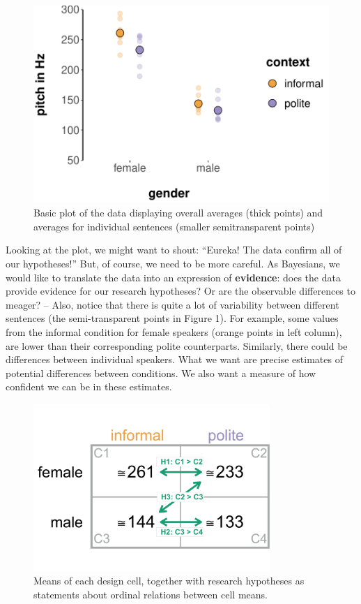 \documentclass[nobib]{tufte-handout}
\begin{document}
\begin{figure}[t]
  \centering
    \includegraphics[width = \textwidth]{pics/basic_data_plot.pdf}
    \caption{Basic plot of the data displaying overall averages (thick points) and averages for individual sentences (smaller semitransparent points)}
     \label{fig:BasicPlotData_data}
\end{figure}


Looking at the plot, we might want to shout: ``Eureka! The data confirm all of our
hypotheses!'' But, of course, we need to be more careful. As Bayesians, we would like to
translate the data into an expression of \textbf{evidence}: does the data provide evidence for
our research hypotheses? Or are the observable differences to meager? -- Also, notice that
there is quite a lot of variability between different sentences (the semi-transparent points in Figure 1).
For example, some values from the informal condition for female speakers (orange points in left
column), are lower than their corresponding polite counterparts. Similarly, there could be differences between individual speakers. What we want are precise
estimates of potential differences between conditions. We also want a measure of how confident we can be in these estimates.

\begin{figure}[h]
  \centering
    \includegraphics[width = 0.8\textwidth]{pics/table_mean_hypotheses.pdf}
    \caption{Means of each design cell, together with research hypotheses as statements about ordinal relations between cell means.}
    \label{fig:BasicPlotData_table}
\end{figure}
\end{document}
